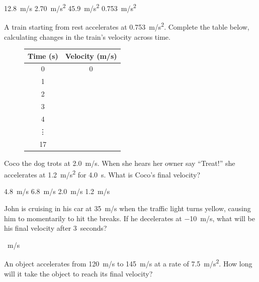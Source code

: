 \documentclass[addpoints]{exam}
\begin{document}
\begin{questions}
\begin{choices}
\choice \SI{12.8}{m/s}
\choice \SI{2.70}{m/s^2}
\choice \SI{45.9}{m/s^2}
\CorrectChoice \SI{0.753}{m/s^2} 
\end{choices}

\question 
A train starting from rest accelerates at \SI{0.753}{m/s^2}. Complete the table below, calculating changes in the train's velocity across time.

\begin{figure}[h!]
    \centering
    \begin{tabular}{c|c}
        \textbf{Time (s)} & \textbf{Velocity (m/s)} \\
        \hline
        0 & 0\\
        1 &  \\
        2 &  \\
        3 &  \\
        4 &  \\
        \vdots &  \\
        17 &  \\
    \end{tabular}
\end{figure}

\question
Coco the dog trots at \SI{2.0}{m/s}. When she hears her owner say ``Treat!'' she accelerates at \SI{1.2}{m/s^2} for \SI{4.0}{s}. What is Coco's final velocity?

\begin{choices}
    \choice \SI{4.8}{m/s}
    \correctchoice \SI{6.8}{m/s}
    \choice \SI{2.0}{m/s}
    \choice \SI{1.2}{m/s}
\end{choices}

John is cruising in his car at \SI{35}{m/s} when the traffic light turns yellow, causing him to momentarily to hit the breaks. If he decelerates at \SI{-10}{m/s}, what will be his final velocity after \SI{3}{seconds}?

\begin{choices}
    \correctchoice \SI{}{m/s}
\end{choices}

\question
An object accelerates from \SI{120}{m/s} to \SI{145}{m/s} at a rate of \SI{7.5}{m/s^2}. How long will it take the object to reach its final velocity?


\end{questions}
\end{document}
